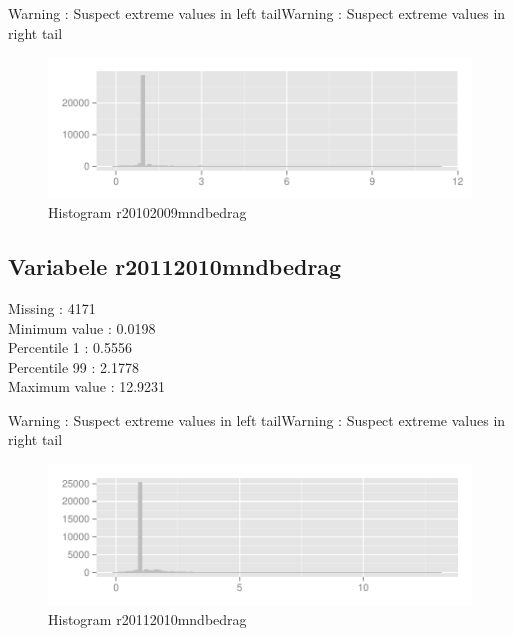 \documentclass[10pt,a4paper,titlepage]{report}
\begin{document}
\color{red}
Warning : Suspect extreme values in left tailWarning : Suspect extreme values in right tail

\color{black}

\begin{figure}[H]
   \centering
\begin{knitrout}
\color{fgcolor}\begin{kframe}


{\ttfamily\noindent\color{warningcolor}{\#\# Warning: position\_stack requires constant width: output may be incorrect}}\end{kframe}
\includegraphics[width=\maxwidth]{figure/unnamed-chunk-10} 

\end{knitrout}

    \caption{Histogram r20102009mndbedrag}
    \label{fig:figPlot5}
\end{figure}


\subsection{Variabele r20112010mndbedrag}

Missing :  4171 \\
Minimum value : 0.0198\\
Percentile 1 : 0.5556\\
Percentile 99 : 2.1778\\
Maximum value : 12.9231

\color{red}
Warning : Suspect extreme values in left tailWarning : Suspect extreme values in right tail

\color{black}

\begin{figure}[H]
   \centering
\begin{knitrout}
\color{fgcolor}
\includegraphics[width=\maxwidth]{figure/unnamed-chunk-12} 

\end{knitrout}

    \caption{Histogram r20112010mndbedrag}
    \label{fig:figPlot6}
\end{figure}
\end{document}
